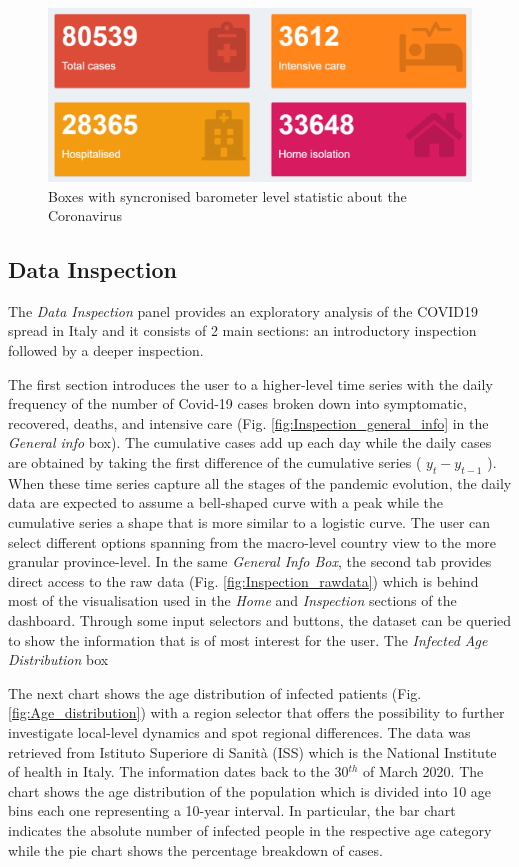 \documentclass[
12pt, %
a4paper, %
oneside, %
headinclude,footinclude, %
BCOR5mm, %
]{scrartcl}
\begin{document}
\begin{figure}[h]
 \centering
 \includegraphics[width=0.5\linewidth]{Figures/Home_figure_3.png} 
 \caption{Boxes with syncronised barometer level statistic about the Coronavirus}
 \label{Home_fig3}
\end{figure}


\subsection{Data Inspection}\label{Data Inspection}

The \textit{Data Inspection} panel provides an exploratory analysis of the COVID19 spread in Italy and it consists of 2 main sections: an introductory inspection followed by a deeper inspection.

The first section introduces the user to a higher-level time series with the daily frequency of the number of Covid-19 cases broken down into symptomatic, recovered, deaths, and intensive care (Fig. \ref{fig:Inspection_general_info} in the \textit{General info} box). The cumulative cases add up each day while the daily cases are obtained by taking the first difference of the cumulative series ( $y_t - y_{t-1}$ ). When these time series capture all the stages of the pandemic evolution, the daily data are expected to assume a bell-shaped curve with a peak while the cumulative series a shape that is more similar to a logistic curve. The user can select different options spanning from the macro-level country view to the more granular province-level. In the same \textit{General Info Box}, the second tab provides direct access to the raw data (Fig. \ref{fig:Inspection_rawdata}) which is behind most of the visualisation used in the \textit{Home} and \textit{Inspection} sections of the dashboard. Through some input selectors and buttons, the dataset can be queried to show the information that is of most interest for the user.
The \textit{Infected Age Distribution} box 

The next chart shows the age distribution of infected patients (Fig. \ref{fig:Age_distribution}) with a region selector that offers the possibility to further investigate local-level dynamics and spot regional differences. The data was retrieved from Istituto Superiore di Sanità (ISS) \cite{epicentro} which is the National Institute of health in Italy. The information dates back to the 30$^{th}$ of March 2020. The chart shows the age distribution of the population which is divided into 10 age bins each one representing a 10-year interval. In particular, the bar chart indicates the absolute number of infected people in the respective age category while the pie chart shows the percentage breakdown of cases.
\end{document}
